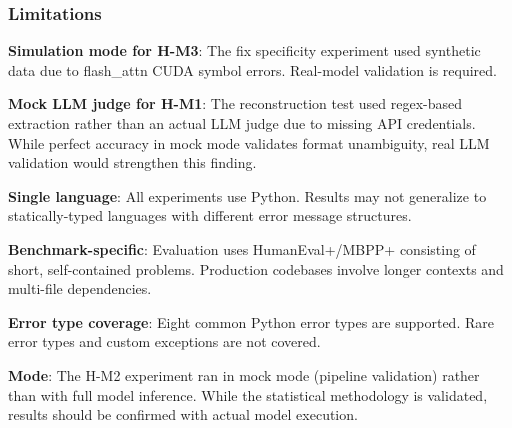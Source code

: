 \subsubsection{Limitations}

\textbf{Simulation mode for H-M3}: The fix specificity experiment used synthetic data due to flash\_attn CUDA symbol errors. Real-model validation is required.

\textbf{Mock LLM judge for H-M1}: The reconstruction test used regex-based extraction rather than an actual LLM judge due to missing API credentials. While perfect accuracy in mock mode validates format unambiguity, real LLM validation would strengthen this finding.

\textbf{Single language}: All experiments use Python. Results may not generalize to statically-typed languages with different error message structures.

\textbf{Benchmark-specific}: Evaluation uses HumanEval+/MBPP+ consisting of short, self-contained problems. Production codebases involve longer contexts and multi-file dependencies.

\textbf{Error type coverage}: Eight common Python error types are supported. Rare error types and custom exceptions are not covered.

\textbf{Mode}: The H-M2 experiment ran in mock mode (pipeline validation) rather than with full model inference. While the statistical methodology is validated, results should be confirmed with actual model execution.
